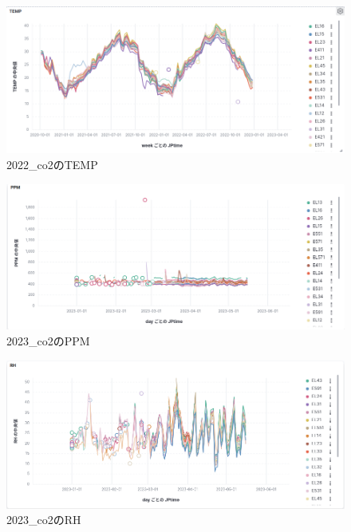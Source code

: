 \documentclass[a4j,12pt,]{jarticle}
\begin{document}
\begin{figure}[H]
  \begin{center}
    \includegraphics[width=160mm]{2022_temp.png}
    \caption{2022\_co2のTEMP}
    \label{p3}
  \end{center}
\end{figure}

\begin{figure}[H]
  \begin{center}
    \includegraphics[width=160mm]{2023_ppm.png}
    \caption{2023\_co2のPPM}
    \label{p4}
  \end{center}
\end{figure}

\begin{figure}[H]
  \begin{center}
    \includegraphics[width=160mm]{2023_rh.png}
    \caption{2023\_co2のRH}
    \label{p5}
  \end{center}
\end{figure}
\end{document}

